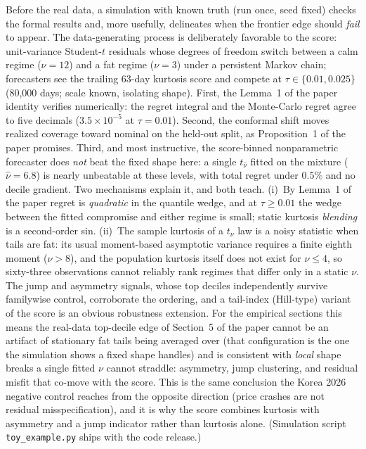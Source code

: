 \documentclass[11pt]{article}
\begin{document}
Before the real data, a simulation with known truth (run once, seed
fixed) checks the formal results and, more usefully, delineates when
the frontier edge should \emph{fail} to appear. The data-generating
process is deliberately favorable to the score: unit-variance
Student-$t$ residuals whose degrees of freedom switch between a calm
regime ($\nu=12$) and a fat regime ($\nu=3$) under a persistent Markov
chain; forecasters see the trailing 63-day kurtosis score and compete
at $\tau \in \{0.01, 0.025\}$ (80{,}000 days; scale known, isolating
shape). First, the Lemma~1 of the paper identity
verifies numerically: the regret integral and the Monte-Carlo regret
agree to five decimals ($3.5\times10^{-5}$ at $\tau=0.01$). Second, the
conformal shift moves realized coverage toward nominal on the held-out
split, as Proposition~1 of the paper promises. Third, and most instructive, the score-binned nonparametric
forecaster does
\emph{not} beat the fixed shape here: a single $t_{\widehat\nu}$
fitted on the mixture ($\widehat\nu = 6.8$) is nearly unbeatable at
these levels, with total regret under $0.5\%$ and no decile gradient.
Two mechanisms explain it, and both teach. (i)~By
Lemma~1 of the paper regret is \emph{quadratic} in the quantile
wedge, and at $\tau \ge 0.01$ the wedge between the fitted compromise
and either regime is small; static kurtosis \emph{blending} is a
second-order sin. (ii)~The sample kurtosis of a $t_\nu$ law is a noisy statistic when
tails are fat: its usual moment-based asymptotic variance requires a
finite eighth moment ($\nu>8$), and the population kurtosis itself does
not exist for $\nu\le4$, so sixty-three observations cannot reliably
rank regimes that differ only in a static $\nu$. The jump and
asymmetry signals, whose top deciles independently survive familywise
control, corroborate the ordering, and a tail-index (Hill-type)
variant of the score is an obvious robustness extension. For the empirical sections this means the real-data top-decile edge of Section~5 of the paper
cannot be an artifact of stationary fat tails being averaged over
(that configuration is the one the simulation shows a fixed shape
handles) and is consistent with \emph{local} shape breaks a single
fitted $\nu$ cannot straddle: asymmetry, jump clustering, and residual misfit
that co-move with the score. This is the same conclusion the Korea 2026
negative control reaches from the opposite direction (price crashes
are not residual misspecification), and it is why the score combines
kurtosis with asymmetry and a jump indicator rather than kurtosis
alone. (Simulation script \texttt{toy\_example.py} ships with the code
release.)
\end{document}
